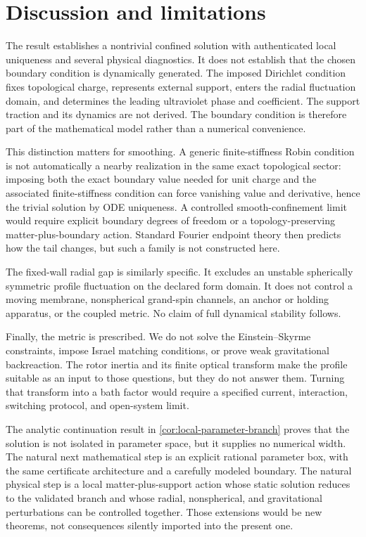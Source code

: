 \section{Discussion and limitations}
\label{sec:discussion}

The result establishes a nontrivial confined solution with authenticated local
uniqueness and several physical diagnostics.  It does not establish that the
chosen boundary condition is dynamically generated.  The imposed Dirichlet
condition fixes topological charge, represents external support, enters the
radial fluctuation domain, and determines the leading ultraviolet phase and
coefficient.  The support traction and its dynamics are not derived.  The
boundary condition is therefore part of the mathematical model rather than a
numerical convenience.

This distinction matters for smoothing.  A generic finite-stiffness Robin
condition is not automatically a nearby realization in the same exact
topological sector: imposing both the exact boundary value needed for unit
charge and the associated finite-stiffness condition can force vanishing value
and derivative, hence the trivial solution by ODE uniqueness.  A controlled
smooth-confinement limit would require explicit boundary degrees of freedom or
a topology-preserving matter-plus-boundary action.  Standard Fourier endpoint
theory then predicts how the tail changes, but such a family is not constructed
here.

The fixed-wall radial gap is similarly specific.  It excludes an unstable
spherically symmetric profile fluctuation on the declared form domain.  It
does not control a moving membrane, nonspherical grand-spin channels, an anchor
or holding apparatus, or the coupled metric.  No claim of full dynamical
stability follows.

Finally, the metric is prescribed.  We do not solve the Einstein--Skyrme
constraints, impose Israel matching conditions, or prove weak gravitational
backreaction.  The rotor inertia and its finite optical transform make the
profile suitable as an input to those questions, but they do not answer them.
Turning that transform into a bath factor would require a specified current,
interaction, switching protocol, and open-system limit.

The analytic continuation result in \cref{cor:local-parameter-branch} proves
that the solution is not isolated in parameter space, but it supplies no
numerical width.  The natural next mathematical step is an explicit rational
parameter box, with the same certificate architecture and a carefully modeled
boundary.
The natural physical step is a local matter-plus-support action whose static
solution reduces to the validated branch and whose radial, nonspherical, and
gravitational perturbations can be controlled together.  Those extensions
would be new theorems, not consequences silently imported into the present
one.

